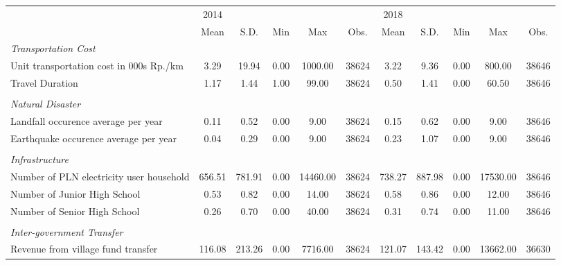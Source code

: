 \begin{tabular}{l*{2}{ccccc}}
\toprule
                &     2014&         &         &         &         &     2018&         &         &         &         \\
                &     Mean&     S.D.&      Min&      Max&     Obs.&     Mean&     S.D.&      Min&      Max&     Obs.\\
\midrule
\emph{Transportation Cost}&         &         &         &         &         &         &         &         &         &         \\
\hspace{0.25cm} Unit transportation cost in 000s Rp./km&     3.29&    19.94&     0.00&  1000.00&    38624&     3.22&     9.36&     0.00&   800.00&    38646\\
\hspace{0.25cm} Travel Duration&     1.17&     1.44&     1.00&    99.00&    38624&     0.50&     1.41&     0.00&    60.50&    38646\\
\vspace{0.05em} \\ \emph{Natural Disaster}&         &         &         &         &         &         &         &         &         &         \\
\hspace{0.25cm} Landfall occurence average per year&     0.11&     0.52&     0.00&     9.00&    38624&     0.15&     0.62&     0.00&     9.00&    38646\\
\hspace{0.25cm} Earthquake occurence average per year&     0.04&     0.29&     0.00&     9.00&    38624&     0.23&     1.07&     0.00&     9.00&    38646\\
\vspace{0.05em} \\ \emph{Infrastructure}&         &         &         &         &         &         &         &         &         &         \\
\hspace{0.25cm} Number of PLN electricity user household&   656.51&   781.91&     0.00& 14460.00&    38624&   738.27&   887.98&     0.00& 17530.00&    38646\\
\hspace{0.25cm} Number of Junior High School&     0.53&     0.82&     0.00&    14.00&    38624&     0.58&     0.86&     0.00&    12.00&    38646\\
\hspace{0.25cm} Number of Senior High School&     0.26&     0.70&     0.00&    40.00&    38624&     0.31&     0.74&     0.00&    11.00&    38646\\
\vspace{0.05em} \\ \emph{Inter-government Transfer}&         &         &         &         &         &         &         &         &         &         \\
\hspace{0.25cm} Revenue from village fund transfer&   116.08&   213.26&     0.00&  7716.00&    38624&   121.07&   143.42&     0.00& 13662.00&    36630\\
\bottomrule
\end{tabular}
